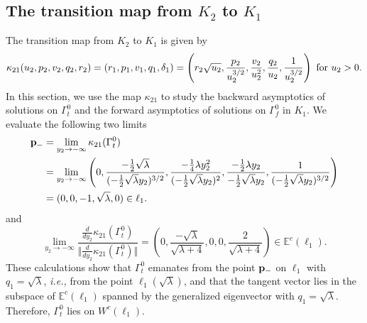 \documentclass[11pt]{article}
\numberwithin{equation}{section}
\begin{document}
\subsection{The transition map from \texorpdfstring{$K_2$ {\rm to} $K_1$}{Lg}} \label{sec:transitionmap-kappa21}

The transition map from $K_2$ to $K_1$ is given by
\begin{equation}\label{eq:kappa12}
\kappa_{21} (u_2,p_2,v_2,q_2,r_2) 
= (r_1,p_1,v_1,q_1,\delta_1)
= \left( 
r_2\sqrt{u_2}, \frac{p_2}{u_2^{3/2}}, \frac{v_2}{u_2^2}, \frac{q_2}{u_2}, \frac{1}{u_2^{3/2}}
\right) \, \, {\rm for} \, \, u_2>0.
\end{equation}
In this section, we use the map $\kappa_{21}$ to study the backward asymptotics of solutions on $\Gamma_t^0$ and the forward asymptotics of solutions on $\Gamma_f^0$ in $K_1$.  
We evaluate the following two limits
\begin{equation} \label{eq:limitKappa21-Gammat}
\begin{split} 
    {\bf p}_- &= \lim_{y_2 \to -\infty} \kappa_{21}(\Gamma_t^0) \\
    &= \lim_{y_2 \to -\infty} \left(
    0, \frac{-\frac{1}{2}\sqrt{\lambda}}{(-\frac{1}{2}\sqrt{\lambda} y_2)^{3/2}},
    \frac{-\frac{1}{4}\lambda y_2^2}{(-\frac{1}{2}\sqrt{\lambda} y_2)^2},
    \frac{-\frac{1}{2}\lambda y_2}{-\frac{1}{2}\sqrt{\lambda} y_2},
    \frac{1}{(-\frac{1}{2}\sqrt{\lambda} y_2)^{3/2}}
    \right) \\
    &=(0,0,-1,\sqrt{\lambda},0) \in \ell_1. 
\end{split}
\end{equation} 
and 
\begin{equation*}
    \lim_{y_2 \to -\infty} 
    \frac{ \frac{d}{dy_2} \kappa_{21}(\Gamma_t^0)} 
    { \Vert \frac{d}{dy_2} \kappa_{21}(\Gamma^0_t) \Vert}
       =\left(0,\frac{-\sqrt{\lambda}}{\sqrt{\lambda + 4}},0,0,\frac{2}{\sqrt{\lambda+4}}\right) \in \mathbb{E}^c(\ell_1). 
\end{equation*}
These calculations show that $\Gamma_t^0$ emanates from the point ${\bf p}_-$ on $\ell_1$ with $q_1=\sqrt{\lambda}$, {\it i.e.,} from the point $\ell_1(\sqrt{\lambda})$, and that the tangent vector lies in the subspace of $\mathbb{E}^c(\ell_1)$ spanned by the generalized eigenvector with $q_1=\sqrt{\lambda}$.
Therefore, $\Gamma^0_t$ lies on $W^{c}(\ell_1)$.
\end{document}
